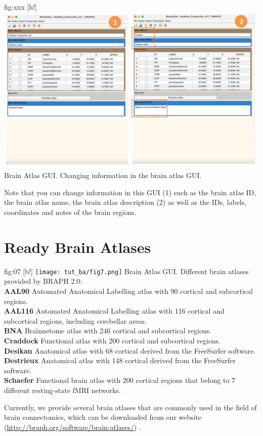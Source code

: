 \documentclass[justified]{tufte-handout}
\begin{document}
	{fig:xxx}
	{
	[h!]
	\includegraphics{tut_ba/fig4.png}
	}
	{Brain Atlas GUI.}
	{
	Changing information in the brain atlas GUI. 
	}

Note that you can change information in this GUI (1) such as the brain atlas ID, the brain atlas name, the brain atlas description (2) as well as the IDs, labels, coordinates and notes of the brain regions.

\clearpage
\section{Ready Brain Atlases}

	{fig:07}
	{
	[b!]
	\texttt{[image: tut\_ba/fig7.png]}
	}
	{Brain Atlas GUI.}
	{
	Different brain atlases provided by BRAPH 2.0: \\
	{\bf AAL90} Automated Anatomical Labelling atlas with 90 cortical and subcortical regions.\\
	{\bf AAL116} Automated Anatomical Labelling atlas with 116 cortical and subcortical regions, including cerebellar areas.\\
	{\bf BNA} Brainnetome atlas with 246 cortical and subcortical regions.\\
	{\bf Craddock} Functional atlas with 200 cortical and subcortical regions.\\
	{\bf Desikan} Anatomical atlas with 68 cortical derived from the FreeSurfer software.\\
	{\bf Destrieux} Anatomical atlas with 148 cortical derived from the FreeSurfer software.\\
	{\bf Schaefer} Functional brain atlas with 200 cortical regions that belong to 7 different resting-state fMRI networks.
	}

Currently, we provide several brain atlases that are commonly used in the field of brain connectomics, which can be downloaded from our website (\url{http://braph.org/software/brain-atlases/}) .
\end{document}
